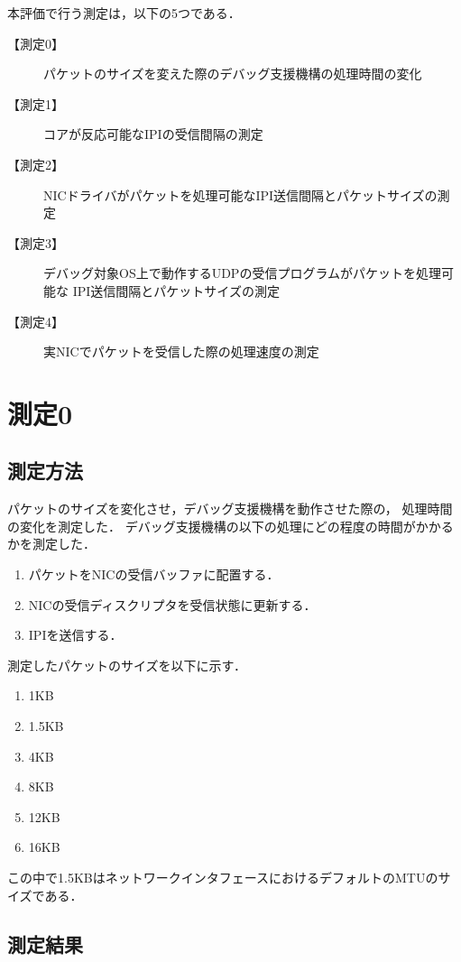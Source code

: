 \documentclass[12pt]{jsarticle}
\begin{document}
本評価で行う測定は，以下の5つである．

\begin{description}
    \item[【測定0】]
        パケットのサイズを変えた際のデバッグ支援機構の処理時間の変化
    \item[【測定1】]
        コアが反応可能なIPIの受信間隔の測定
    \item[【測定2】]
        NICドライバがパケットを処理可能なIPI送信間隔とパケットサイズの測定
    \item[【測定3】]
        デバッグ対象OS上で動作するUDPの受信プログラムがパケットを処理可能な
        IPI送信間隔とパケットサイズの測定
    \item[【測定4】]
        実NICでパケットを受信した際の処理速度の測定
\end{description}

\section{測定0}

\subsection{測定方法}

パケットのサイズを変化させ，デバッグ支援機構を動作させた際の，
処理時間の変化を測定した．
デバッグ支援機構の以下の処理にどの程度の時間がかかるかを測定した．
\begin{enumerate}
    \item パケットをNICの受信バッファに配置する．
    \item NICの受信ディスクリプタを受信状態に更新する．
    \item IPIを送信する．
\end{enumerate}
測定したパケットのサイズを以下に示す．
\begin{enumerate}
    \item 1KB
    \item 1.5KB
    \item 4KB
    \item 8KB
    \item 12KB
    \item 16KB
\end{enumerate}
この中で1.5KBはネットワークインタフェースにおけるデフォルトのMTUのサイズである．

\subsection{測定結果}\label{result-time}
\end{document}

